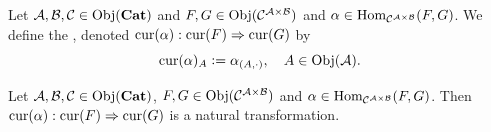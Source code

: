 \documentclass{book}
\begin{document}
	\begin{defn} 
		Let $\MA, \MB, \MC \in \Obj(\bCat)$ and $F,G \in \Obj(\MC^{\MA \times \MB})$ and $\al \in \Hom_{\MC^{\MA \times \MB}}(F,G)$. We define the , denoted $\cur(\al): \cur(F) \Rightarrow \cur(G)$ by 
		$$\cur(\al)_A \defeq \al_{(A, \cdot)}, \quad A \in \Obj(\MA).$$
	\end{defn}
	
	\begin{ex} 
		Let $\MA, \MB, \MC \in \Obj(\bCat)$, $F,G \in \Obj(\MC^{\MA \times \MB})$ and $\al \in \Hom_{\MC^{\MA \times \MB}}(F,G)$. Then $\cur(\al): \cur(F) \Rightarrow \cur(G)$ is a natural transformation. 
	\end{ex}
	
\end{document}
